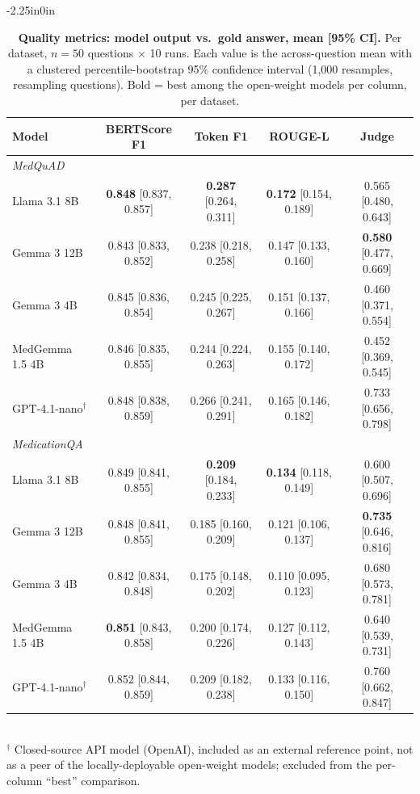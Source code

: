 \documentclass[10pt,letterpaper]{article}
\begin{document}
\begin{table}[!ht]
\begin{adjustwidth}{-2.25in}{0in}
\centering
\caption{{\bf Quality metrics: model output vs.\ gold answer, mean [95\% CI].}
Per dataset, $n{=}50$ questions $\times$ 10 runs. Each value is the
across-question mean with a clustered percentile-bootstrap 95\% confidence
interval (1{,}000 resamples, resampling questions). Bold = best among the
open-weight models per column, per dataset.}
\label{tab:quality}
\footnotesize
\begin{tabular}{lcccc}
\toprule
\textbf{Model} & \textbf{BERTScore F1} & \textbf{Token F1} & \textbf{ROUGE-L} & \textbf{Judge} \\
\midrule
\multicolumn{5}{l}{\emph{MedQuAD}}\\
Llama 3.1 8B      & \textbf{0.848} [0.837, 0.857] & \textbf{0.287} [0.264, 0.311] & \textbf{0.172} [0.154, 0.189] & 0.565 [0.480, 0.643] \\
Gemma 3 12B       & 0.843 [0.833, 0.852] & 0.238 [0.218, 0.258] & 0.147 [0.133, 0.160] & \textbf{0.580} [0.477, 0.669] \\
Gemma 3 4B        & 0.845 [0.836, 0.854] & 0.245 [0.225, 0.267] & 0.151 [0.137, 0.166] & 0.460 [0.371, 0.554] \\
MedGemma 1.5 4B   & 0.846 [0.835, 0.855] & 0.244 [0.224, 0.263] & 0.155 [0.140, 0.172] & 0.452 [0.369, 0.545] \\
GPT-4.1-nano$^\dagger$ & 0.848 [0.838, 0.859] & 0.266 [0.241, 0.291] & 0.165 [0.146, 0.182] & 0.733 [0.656, 0.798] \\
\midrule
\multicolumn{5}{l}{\emph{MedicationQA}}\\
Llama 3.1 8B      & 0.849 [0.841, 0.855] & \textbf{0.209} [0.184, 0.233] & \textbf{0.134} [0.118, 0.149] & 0.600 [0.507, 0.696] \\
Gemma 3 12B       & 0.848 [0.841, 0.855] & 0.185 [0.160, 0.209] & 0.121 [0.106, 0.137] & \textbf{0.735} [0.646, 0.816] \\
Gemma 3 4B        & 0.842 [0.834, 0.848] & 0.175 [0.148, 0.202] & 0.110 [0.095, 0.123] & 0.680 [0.573, 0.781] \\
MedGemma 1.5 4B   & \textbf{0.851} [0.843, 0.858] & 0.200 [0.174, 0.226] & 0.127 [0.112, 0.143] & 0.640 [0.539, 0.731] \\
GPT-4.1-nano$^\dagger$ & 0.852 [0.844, 0.859] & 0.209 [0.182, 0.238] & 0.133 [0.116, 0.150] & 0.760 [0.662, 0.847] \\
\bottomrule
\end{tabular}
\\[2pt]
{\footnotesize $^\dagger$ Closed-source API model (OpenAI), included as an
external reference point, not as a peer of the locally-deployable open-weight
models; excluded from the per-column ``best'' comparison.}
\end{adjustwidth}
\end{table}
\end{document}
